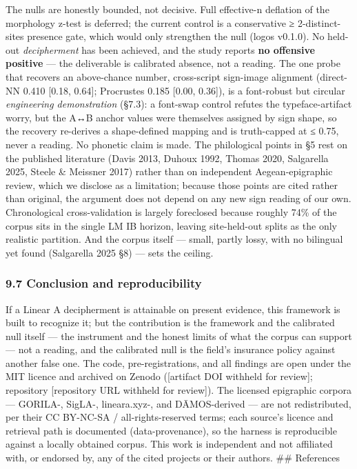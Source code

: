 \documentclass[
  10pt,
]{article}
\begin{document}
The nulls are honestly bounded, not decisive. Full effective-n deflation
of the morphology z-test is deferred; the current control is a
conservative ≥ 2-distinct-sites presence gate, which would only
strengthen the null (logos v0.1.0). No held-out \emph{decipherment} has
been achieved, and the study reports \textbf{no offensive positive} ---
the deliverable is calibrated absence, not a reading. The one probe that
recovers an above-chance number, cross-script sign-image alignment
(direct-NN 0.410 {[}0.18, 0.64{]}; Procrustes 0.185 {[}0.00, 0.36{]}),
is a font-robust but circular \emph{engineering demonstration} (§7.3): a
font-swap control refutes the typeface-artifact worry, but the A↔B
anchor values were themselves assigned by sign shape, so the recovery
re-derives a shape-defined mapping and is truth-capped at ≤ 0.75, never
a reading. No phonetic claim is made. The philological points in §5 rest
on the published literature (Davis 2013, Duhoux 1992, Thomas 2020,
Salgarella 2025, Steele \& Meissner 2017) rather than on independent
Aegean-epigraphic review, which we disclose as a limitation; because
those points are cited rather than original, the argument does not
depend on any new sign reading of our own. Chronological
cross-validation is largely foreclosed because roughly 74\% of the
corpus sits in the single LM IB horizon, leaving site-held-out splits as
the only realistic partition. And the corpus itself --- small, partly
lossy, with no bilingual yet found (Salgarella 2025 §8) --- sets the
ceiling.

\hypertarget{conclusion-and-reproducibility}{%
\subsubsection{9.7 Conclusion and
reproducibility}\label{conclusion-and-reproducibility}}

If a Linear A decipherment is attainable on present evidence, this
framework is built to recognize it; but the contribution is the
framework and the calibrated null itself --- the instrument and the
honest limits of what the corpus can support --- not a reading, and the
calibrated null is the field's insurance policy against another false
one. The code, pre-registrations, and all findings are open under the
MIT licence and archived on Zenodo ({[}artifact DOI withheld for
review{]}; repository {[}repository URL withheld for review{]}). The
licensed epigraphic corpora --- GORILA-, SigLA-, lineara.xyz-, and
DĀMOS-derived --- are not redistributed, per their CC BY-NC-SA /
all-rights-reserved terms; each source's licence and retrieval path is
documented (data-provenance), so the harness is reproducible against a
locally obtained corpus. This work is independent and not affiliated
with, or endorsed by, any of the cited projects or their authors. \#\#
References
\end{document}

